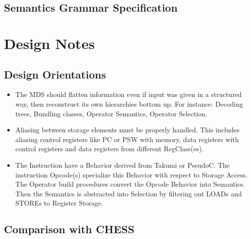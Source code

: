 \documentclass[11pt,a4paper]{article}
\begin{document}
\subsection{Semantics Grammar Specification}


\section{Design Notes}


\subsection{Design Orientations}

\begin{itemize}

\item The MDS should flatten information even if input was given in a structured
way, then reconstruct its own hierarchies bottom up. For instance: Decoding
trees, Bundling classes, Operator Semantics, Operator Selection.

\item Aliasing between storage elements must be properly handled. This includes
aliasing control registers like PC or PSW with memory, data registers with
control registers and data registers from different RegClass(es).

\item The Instruction have a Behavior derived from Takumi or PseudoC. The
instruction Opcode(s) specialize this Behavior with respect to Storage Access.
The Operator build procedures convert the Opcode Behavior into Semantics. Then
the Semantics is abstracted into Selection by filtering out LOADs and STOREs to
Register Storage.

\end{itemize}


\subsection{Comparison with CHESS}
\end{document}

